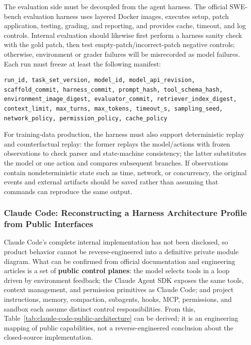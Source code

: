 \documentclass[10pt,a4paper,UTF8,fontset=none]{ctexart}
\begin{document}
The evaluation side must be decoupled from the agent harness. The official SWE-bench evaluation harness uses layered Docker images, executes setup, patch application, testing, grading, and reporting, and provides cache, timeout, and log controls\cite{swebenchharness2026}. Internal evaluation should likewise first perform a harness sanity check with the gold patch, then test empty-patch/incorrect-patch negative controls; otherwise, environment or grader failures will be misrecorded as model failures. Each run must freeze at least the following manifest:

\begin{lstlisting}[style=codeblock,caption={Minimal Reproducibility Information in a Harness Run Manifest},label={lst:harness-manifest}]
run_id, task_set_version, model_id, model_api_revision,
scaffold_commit, harness_commit, prompt_hash, tool_schema_hash,
environment_image_digest, evaluator_commit, retriever_index_digest,
context_limit, max_turns, max_tokens, timeout_s, sampling_seed,
network_policy, permission_policy, cache_policy
\end{lstlisting}

For training-data production, the harness must also support deterministic replay and counterfactual replay: the former replays the model/actions with frozen observations to check parser and state-machine consistency; the latter substitutes the model or one action and compares subsequent branches. If observations contain nondeterministic state such as time, network, or concurrency, the original events and external artifacts should be saved rather than assuming that commands can reproduce the same output.

\subsubsection{Claude Code: Reconstructing a Harness Architecture Profile from Public Interfaces}

Claude Code's complete internal implementation has not been disclosed, so product behavior cannot be reverse-engineered into a definitive private module diagram. What can be confirmed from official documentation and engineering articles is a set of \textbf{public control planes}: the model selects tools in a loop driven by environment feedback; the Claude Agent SDK exposes the same tools, context management, and permission primitives as Claude Code; and project instructions, memory, compaction, subagents, hooks, MCP, permissions, and sandbox each assume distinct control responsibilities\cite{anthropic2024agents,anthropic2025bestpractices,anthropic2025autonomy}. From this, Table~\ref{tab:claude-code-public-architecture} can be derived; it is an engineering mapping of public capabilities, not a reverse-engineered conclusion about the closed-source implementation.
\end{document}
